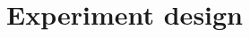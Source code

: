 \documentclass[11pt]{article}
\begin{document}








\section{Experiment design}



\end{document}

